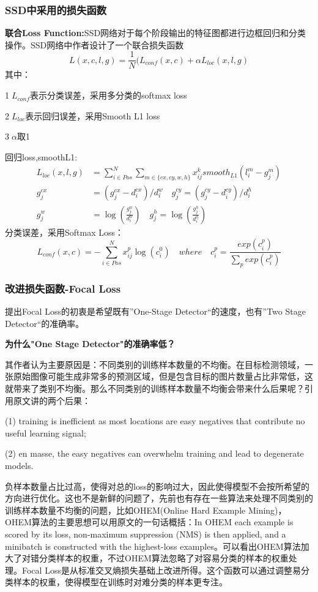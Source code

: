 \subsubsection{SSD中采用的损失函数}
\textbf{联合Loss Function:}SSD网络对于每个阶段输出的特征图都进行边框回归和分类操作。SSD网络中作者设计了一个联合损失函数
\begin{equation}
	L(x,c,l,g) = \frac{1}{N}(L_{conf}(x,c) + \alpha L_{loc}(x,l,g)
\end{equation}
其中：

 \textcircled{1}$L_{conf}$表示分类误差，采用多分类的softmax loss
 
 \textcircled{2}$L_{loc}$表示回归误差，采用Smooth L1 loss
 
\textcircled{3}$\alpha$取1
 
回归loss,smoothL1:
\begin{align}
	L_{loc}(x,l,g) &= \sum _{i \in Pos} ^{N} \sum_{m \in \{cx,cy,w,h\}} x_{ij}^k smooth _{L1} (l_i ^m - g_j ^m) \\
	g_j^{cx} &= \left( g_j ^{cx} - d_i ^{cx} \right) / d_i ^w \quad g_j^{cy} = (g_j^{cy} - d_i^{cy}) / d_i ^h \\
	g_j^w &= \log(\frac{g_j^w}{d_i^w}) \quad g_j^h = \log(\frac{g_j^h}{d_i^h})
\end{align}	
分类误差，采用Softmax Loss：
\begin{equation}
L_{conf}(x, c) = -\sum_{i \in Pos}^N x_{ij}^p\log(c_i^0) \quad where \quad c_i^p = \frac{exp(c_i^p)}{\sum_{p}exp(c_i^p)} 
\end{equation}
\subsubsection{改进损失函数-Focal Loss}
提出Focal Loss的初衷是希望既有”One-Stage Detector“的速度，也有”Two Stage Detector“的准确率。

\textbf{为什么"One Stage Detector"的准确率低？}

其作者认为主要原因是：不同类别的训练样本数量的不均衡。在目标检测领域，一张原始图像可能生成非常多的预测区域，但是包含目标的图片数量占比非常低，这就带来了类别不均衡。那么不同类别的训练样本数量不均衡会带来什么后果呢？引用原文讲的两个后果：

(1) training is inefficient as most locations are easy negatives that contribute no useful learning signal; 

(2) en masse, the easy negatives can overwhelm training and lead to degenerate models. \cite{focal-loss}

负样本数量占比过高，使得对总的loss的影响过大，因此使得模型不会按所希望的方向进行优化。这也不是新鲜的问题了，先前也有存在一些算法来处理不同类别的训练样本数量不均衡的问题，比如OHEM(Online Hard Example Mining)\cite{ohem}，OHEM算法的主要思想可以用原文的一句话概括：In OHEM each example is scored by its loss, non-maximum suppression (NMS\cite{soft-nms}) is then applied, and a minibatch is constructed with the highest-loss examples。\cite{ohem}可以看出OHEM算法加大了对错分类样本的权重，不过OHEM算法忽略了对容易分类的样本的权重处理。Focal Loss是从标准交叉熵损失基础上改进所得。这个函数可以通过调整易分类样本的权重，使得模型在训练时对难分类的样本更专注。

